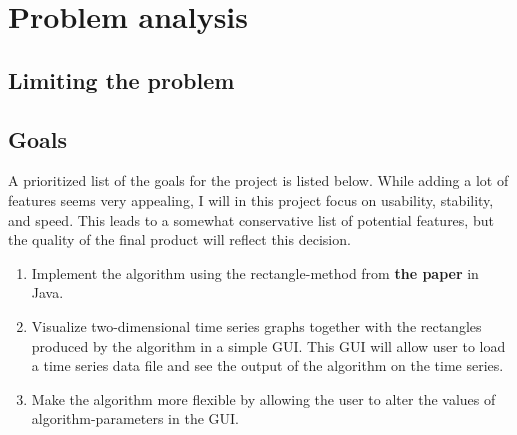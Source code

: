 
\section{Problem analysis}

\subsection{Limiting the problem}


\subsection{Goals}

A prioritized list of the goals for the project is listed below. While adding a
lot of features seems very appealing, I will in this project focus on usability,
stability, and speed. This leads to a somewhat conservative list of potential
features, but the quality of the final product will reflect this decision. 

\begin{enumerate}
    \item Implement the algorithm using the rectangle-method from \textbf{the
    paper} in Java. 
    
    \item Visualize two-dimensional time series graphs together with the
    rectangles produced by the algorithm in a simple GUI. This GUI will allow
    user to load a time series data file and see the output of the algorithm on
    the time series. 

    \item Make the algorithm more flexible by allowing the user to alter the
    values of algorithm-parameters in the GUI. 

    
    
\end{enumerate}